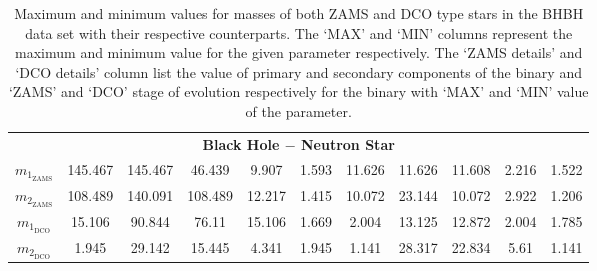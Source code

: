 \documentclass[journal, twocolumn]{IEEEtran}
\newcommand{\mone}[1]{m_{1_{\text{#1}}}}
\newcommand{\mtwo}[1]{m_{2_{\text{#1}}}}
\begin{document}
\begin{table}[!h]
{\begin{tabular}{@{}ccccccccccc@{}}
				\multicolumn{11}{c}{\textbf{Black Hole $-$ Neutron Star}} \\

				$\mone{ZAMS}$ & 145.467 & 145.467 & 46.439 & 9.907 & 1.593 & 11.626 & 11.626 & 11.608 & 2.216 & 1.522 \\
				$\mtwo{ZAMS}$ & 108.489 & 140.091 & 108.489 & 12.217 & 1.415 & 10.072 & 23.144 & 10.072 & 2.922 & 1.206 \\
				$\mone{DCO}$ & 15.106 & 90.844 & 76.11 & 15.106 & 1.669 & 2.004 & 13.125 & 12.872 & 2.004 & 1.785 \\
				$\mtwo{DCO}$ & 1.945 & 29.142 & 15.445 & 4.341 & 1.945 & 1.141 & 28.317 & 22.834 & 5.61 & 1.141 \\ \bottomrule
			\end{tabular}%
		}
		\caption{Maximum and minimum values for masses of both ZAMS and DCO type stars in the BHBH data set with their respective counterparts. The `MAX' and `MIN' columns represent the maximum and minimum value for the given parameter respectively. The `ZAMS details' and `DCO details' column list the value of primary and secondary components of the binary and `ZAMS' and `DCO' stage of evolution respectively for the binary with `MAX' and `MIN' value of the parameter.}
		\label{tab:bhbh-details-table}
	\end{table}

%
\end{document}
